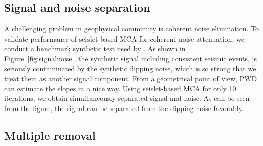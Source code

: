 \subsection{Signal and noise separation}

A challenging problem in geophysical community is coherent noise elimination. To validate performance of seislet-based MCA for coherent noise attenuation, we conduct a benchmark synthetic test used by \cite{fomel2002applications}. As shown in Figure~\ref{fig:signalnoise}, the synthetic signal including consistent seismic events, is seriously contaminated by the synthetic dipping noise, which is so strong that we treat them as another signal component. From a geometrical point of view, PWD can estimate the slopes in a nice way. Using seislet-based MCA for only 10 iterations, we obtain simultaneously separated signal and noise. As can be seen from the figure, the signal can be separated from the dipping noise favorably.



  

\subsection{Multiple removal}

